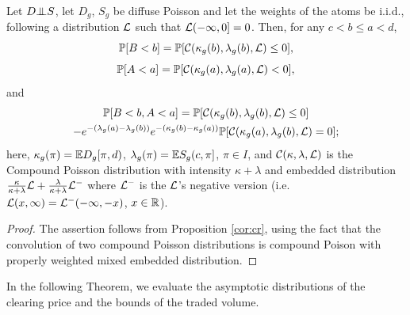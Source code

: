 \documentclass{aptpub}
\begin{document}
\begin{theorem} Let $D \indep S$, let $D_g$, $S_g$ be diffuse Poisson and let the weights of the atoms be i.i.d., following a distribution $\mathcal{L}$ such that $\mathcal{L}(-\infty,0]=0$. Then, for any $c < b \leq a < d$,
\begin{equation}
\label{eq:pbcp}
\mathbb{P}[B<b] = \mathbb{P}[\mathcal{C}(\kappa_g(b),\lambda_g(b),\mathcal{L})\leq 0],
\end{equation}
\begin{equation}
\label{eq:pacp}
\mathbb{P}[A<a] = \mathbb{P}[\mathcal{C}(\kappa_g(a),\lambda_g(a),\mathcal{L})< 0],
\end{equation}
and
\begin{multline*}
\mathbb{P}[B<b,A<a] = \mathbb{P}[\mathcal{C}(\kappa_g(b),\lambda_g(b),\mathcal{L})\leq 0]
\\
- e^{-(\lambda_g(a)-\lambda_g(b))}e^{-(\kappa_g(b)-\kappa_g(a))}\mathbb{P}[\mathcal{C}(\kappa_g(a),\lambda_g(b),\mathcal{L})=0];
\end{multline*}
here, $\kappa_g(\pi)=\mathbb{E} D_g[\pi,d)$, $\lambda_g(\pi)=\mathbb{E} S_g(c,\pi]$, $\pi \in I$, and $\mathcal{C}(\kappa,\lambda,\mathcal{L})$ is the Compound Poisson distribution with intensity $\kappa+\lambda$ and embedded distribution $\frac\kappa{\kappa+\lambda} \mathcal{L} + \frac\lambda{\kappa+\lambda} \mathcal{L}^-$ where $\mathcal{L}^-$ is  the $\mathcal{L}$'s negative version (i.e. $\mathcal{L}(x,\infty)=\mathcal{L}^-(-\infty,-x)$, $x \in \mathbb{R}$).
\end{theorem}
\begin{proof}
The assertion follows from Proposition \ref{cor:cr}, using the fact that the convolution of two compound Poisson distributions is compound Poison with properly weighted mixed embedded distribution.
\end{proof}


\noindent In the following Theorem, we evaluate the asymptotic distributions of the clearing price and the bounds of the traded volume.
\end{document}
